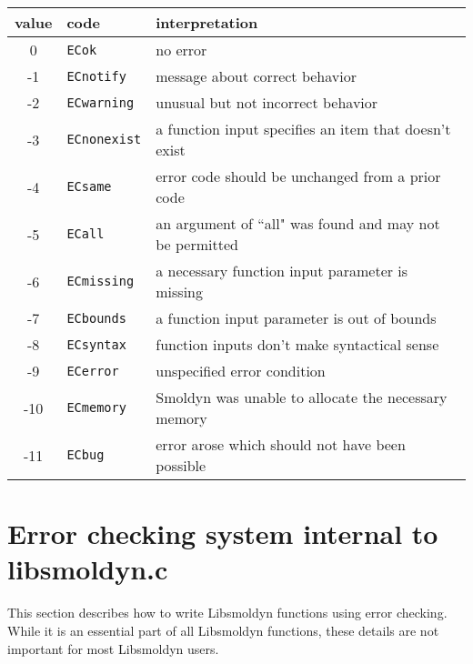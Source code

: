 \documentclass {book}
\begin{document}
\begin{longtable}[c]{cll}
value & code & interpretation\\
\hline
0 & \texttt{ECok} & no error\\
-1 & \texttt{ECnotify} & message about correct behavior\\
-2 & \texttt{ECwarning} & unusual but not incorrect behavior\\
-3 & \texttt{ECnonexist} & a function input specifies an item that doesn't exist\\
-4 & \texttt{ECsame} & error code should be unchanged from a prior code\\
-5 & \texttt{ECall} & an argument of ``all" was found and may not be permitted\\
-6 & \texttt{ECmissing} & a necessary function input parameter is missing\\
-7 & \texttt{ECbounds} & a function input parameter is out of bounds\\
-8 & \texttt{ECsyntax} & function inputs don't make syntactical sense\\
-9 & \texttt{ECerror} & unspecified error condition\\
-10 & \texttt{ECmemory} & Smoldyn was unable to allocate the necessary memory\\
-11 & \texttt{ECbug} & error arose which should not have been possible\\

\end{longtable}


\section{Error checking system internal to libsmoldyn.c}

This section describes how to write Libsmoldyn functions using error checking.  While it is an essential part of all Libsmoldyn functions, these details are not important for most Libsmoldyn users.
\end{document}
